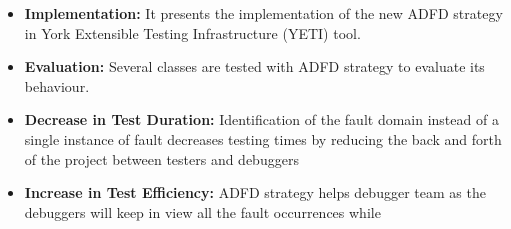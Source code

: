 \documentclass{acm_proc_article-sp}
\begin{document}
\begin{itemize}
\item \textbf{Implementation:} It presents the implementation of the new ADFD strategy in York Extensible Testing Infrastructure (YETI) tool.
\item \textbf{Evaluation:} Several classes are tested with ADFD strategy to evaluate its behaviour.
\item \textbf{Decrease in Test Duration:} Identification of the fault domain instead of a single instance of fault decreases testing times by reducing the back and forth of the project between testers and debuggers
\item \textbf{Increase in Test Efficiency:} ADFD strategy helps debugger team as the debuggers will keep in view all the fault occurrences while \end{itemize}







\end{document}
